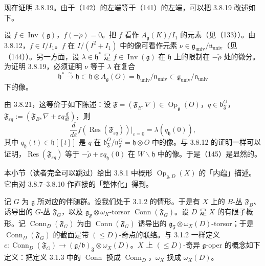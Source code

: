  现在证明 3.8.19。由于（142）的左端等于（141）的左端，可以把 3.8.19 改述如下。

设 $f\in\operatorname{Inv}(\mathfrak{g})$，$f(-\check\rho)=0$。把 $f$ 看作 $A_{\mathfrak{g}}(K)/I_{1}$ 的元素（见（133））。由 3.8.12，$f\in I/I_{1}$。$f$ 在 $I/(I^{2}+I_{1})$ 中的像可看作元素 $\nu\in\mathfrak{g}_{\mathrm{univ}}/\mathfrak{n}_{\mathrm{univ}}$（见（144））。另一方面，设 $\lambda\in\mathfrak{h}^{*}$ 是 $f\in\operatorname{Inv}(\mathfrak{g})$ 在 $\mathfrak{h}$ 上的限制在 $-\check\rho$ 处的微分。为证明 3.8.19，必须证明 $\nu$ 等于 $\lambda$ 在复合
\[
\mathfrak{h}^{*}\xrightarrow{\sim}\mathfrak{h}\subset\mathfrak{h}\otimes A_{\mathfrak{g}}(O)
  =\mathfrak{h}_{\mathrm{univ}}/\mathfrak{n}_{\mathrm{univ}}\subset\mathfrak{g}_{\mathrm{univ}}/\mathfrak{n}_{\mathrm{univ}}
\]
下的像。

由 3.8.21，这等价于如下陈述：设 $\mathfrak{F}=(\mathfrak{F}_{B},\nabla)\in\operatorname{Op}_{\mathfrak{g}}(O)$，$q\in\mathfrak{b}^{O}_{\mathfrak{F}}$，$\mathfrak{F}_{\varepsilon q}:=(\mathfrak{F}_{B},\nabla+\varepsilon q\frac{d}{dt})$，则
\begin{equation}\tag{145}
  \frac{d}{d\varepsilon}f(\operatorname{Res}(\mathfrak{F}_{\varepsilon q}))|_{\varepsilon=0}=\lambda(q_{\mathfrak{h}}(0)),
\end{equation}
其中 $q_{\mathfrak{h}}(t)\in\mathfrak{h}[[t]]$ 是 $q$ 在 $\mathfrak{b}^{O}_{\mathfrak{F}}/\mathfrak{n}^{O}_{\mathfrak{F}}=\mathfrak{h}\otimes O$ 中的像。与 3.8.12 的证明一样可以证明，$\operatorname{Res}(\mathfrak{F}_{\varepsilon q})$ 等于 $-\check\rho+\varepsilon q_{\mathfrak{h}}(0)$ 在 $W\backslash\mathfrak{h}$ 中的像。于是（145）是显然的。


 本小节（读者完全可以跳过）给出 3.8.1 中概形 $\operatorname{Op}_{\mathfrak{g},D}(X)$ 的「内蕴」描述。它由对 3.8.7--3.8.10 作直接的「整体化」得到。

记 $G$ 为 $\mathfrak{g}$ 所对应的伴随群。设我们处于 3.1.2 的情形。于是有 $X$ 上的 $B$-丛 $\mathfrak{F}_{B}$、诱导出的 $G$-丛 $\mathfrak{F}_{G}$，以及 $\mathfrak{g}_{\mathfrak{F}}\otimes\omega_{X}$-torsor $\operatorname{Conn}(\mathfrak{F}_{G})$。设 $D$ 是 $X$ 的有限子概形。记 $\operatorname{Conn}_{D}(\mathfrak{F}_{G})$ 为由 $\operatorname{Conn}(\mathfrak{F}_{G})$ 诱导出的 $\mathfrak{g}_{\mathfrak{F}}\otimes\omega_{X}(D)$-torsor；于是 $\operatorname{Conn}_{D}(\mathfrak{F}_{G})$ 的截面是带 $(\le D)$-奇点的联络。与 3.1.2 一样定义 $c:\operatorname{Conn}_{D}(\mathfrak{F}_{G})\to(\mathfrak{g}/\mathfrak{b})_{\mathfrak{F}}\otimes\omega_{X}(D)$。$X$ 上 $(\le D)$-奇异 $\mathfrak{g}$-oper 的概念如下定义：把定义 3.1.3 中的 $\operatorname{Conn}$ 换成 $\operatorname{Conn}_{D}$，$\omega_{X}$ 换成 $\omega_{X}(D)$。

